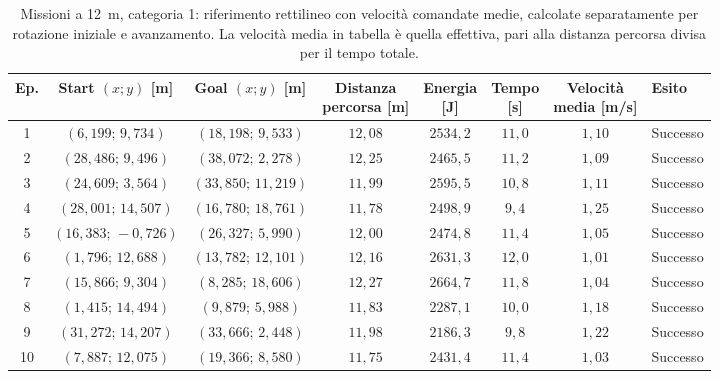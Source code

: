 \begin{table}[H]
\centering
\caption{Missioni a 12~m, categoria 1: riferimento rettilineo con velocità comandate medie, calcolate separatamente per rotazione iniziale e avanzamento. La velocità media in tabella è quella effettiva, pari alla distanza percorsa divisa per il tempo totale.}
\label{tab:straight-line-command-mean-12m-cat1}
\begingroup
\fontsize{9}{11}\selectfont
\setlength{\tabcolsep}{2.5pt}
\renewcommand{\arraystretch}{1.2}
\begin{tabular}{@{}c cc cccc l@{}}
\toprule
Ep. & \shortstack{Start $(x;y)$\\{}[m]} & \shortstack{Goal $(x;y)$\\{}[m]} & \shortstack{Distanza\\percorsa [m]} & \shortstack{Energia\\{}[J]} & \shortstack{Tempo\\{}[s]} & \shortstack{Velocità\\media [m/s]} & Esito \\
\midrule
1 & $(6{,}199;\,9{,}734)$ & $(18{,}198;\,9{,}533)$ & $12{,}08$ & $2534{,}2$ & $11{,}0$ & $1{,}10$ & Successo \\
2 & $(28{,}486;\,9{,}496)$ & $(38{,}072;\,2{,}278)$ & $12{,}25$ & $2465{,}5$ & $11{,}2$ & $1{,}09$ & Successo \\
3 & $(24{,}609;\,3{,}564)$ & $(33{,}850;\,11{,}219)$ & $11{,}99$ & $2595{,}5$ & $10{,}8$ & $1{,}11$ & Successo \\
4 & $(28{,}001;\,14{,}507)$ & $(16{,}780;\,18{,}761)$ & $11{,}78$ & $2498{,}9$ & $9{,}4$ & $1{,}25$ & Successo \\
5 & $(16{,}383;\,-0{,}726)$ & $(26{,}327;\,5{,}990)$ & $12{,}00$ & $2474{,}8$ & $11{,}4$ & $1{,}05$ & Successo \\
6 & $(1{,}796;\,12{,}688)$ & $(13{,}782;\,12{,}101)$ & $12{,}16$ & $2631{,}3$ & $12{,}0$ & $1{,}01$ & Successo \\
7 & $(15{,}866;\,9{,}304)$ & $(8{,}285;\,18{,}606)$ & $12{,}27$ & $2664{,}7$ & $11{,}8$ & $1{,}04$ & Successo \\
8 & $(1{,}415;\,14{,}494)$ & $(9{,}879;\,5{,}988)$ & $11{,}83$ & $2287{,}1$ & $10{,}0$ & $1{,}18$ & Successo \\
9 & $(31{,}272;\,14{,}207)$ & $(33{,}666;\,2{,}448)$ & $11{,}98$ & $2186{,}3$ & $9{,}8$ & $1{,}22$ & Successo \\
10 & $(7{,}887;\,12{,}075)$ & $(19{,}366;\,8{,}580)$ & $11{,}75$ & $2431{,}4$ & $11{,}4$ & $1{,}03$ & Successo \\
\bottomrule
\end{tabular}
\endgroup
\end{table}

